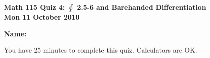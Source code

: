 \documentclass[11pt,letterpaper]{article}
\begin{document}
\flushleft
\begin{multicols}{2}


\begin{large}\textbf{Math 115 Quiz 4: $\oint $ 2.5-6 and Barehanded Differentiation \\
Mon 11 October 2010}\end{large}

\textbf{Name:  }\underline{\hspace{35ex}}

\vspace{.5in}

\end{multicols}

\pagestyle{empty}

\flushleft

You have 25 minutes to complete this quiz.  Calculators are OK.  
\end{document}
